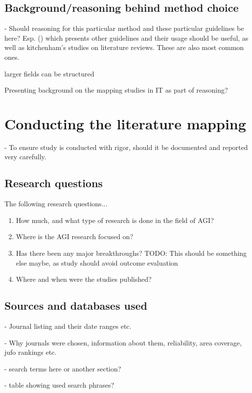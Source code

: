 \documentclass[utf8,english]{gradu3}
\begin{document}
\section{Background/reasoning behind method choice}

- Should reasoning for this particular method and these particular guidelines
be here? Esp. (\cite{petersen2015}) which presents
other guidelines and their usage should be useful, as well as kitchenham's 
studies on literature reviews. These are also most common ones.

larger fields can be structured 

Presenting background on the mapping studies in IT as part of reasoning?

\chapter{Conducting the literature mapping}

- To ensure study is conducted with rigor, should it be documented and reported
very carefully.

\section{Research questions}

The following research questions...

\begin{enumerate}
  \item How much, and what type of research is done in the field of AGI?
  \item Where is the AGI research focused on?
  \item Has there been any major breakthroughs? TODO: This should be something else maybe, as study should avoid outcome evaluation
  \item Where and when were the studies published?
\end{enumerate}

\section{Sources and databases used}
- Journal listing and their date ranges etc.

- Why journals were chosen, information about them, reliability, area coverage,
jufo rankings etc.

- search terms here or another section? 

- table showing used search phrases?
\end{document}
